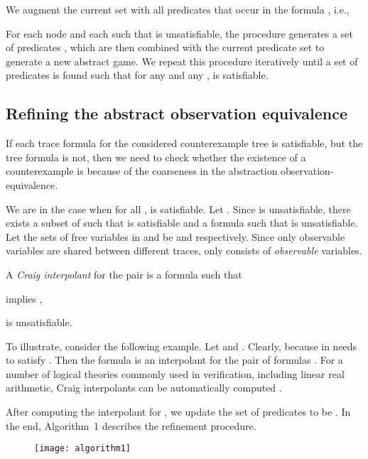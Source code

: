 \documentclass[letterpaper, 10 pt, conference]{ieeeconf}
\begin{document}
We augment the current set  with all
predicates that occur in the formula , i.e.,

For each node  and each  such that  is unsatisfiable, the procedure generates a set of predicates
, which are then combined with the
current predicate set to generate a new abstract game. We repeat
this procedure iteratively until a set of predicates is found such
that for any  and any ,  is satisfiable.

\subsection{Refining the abstract observation equivalence}
\label{subsec:refineobeq}
If each trace formula for the considered counterexample tree is satisfiable, but the tree formula is not, then we need to check
whether the existence of a counterexample is because of the
coarseness in the abstraction observation-equivalence.

We are in the case when for all ,   is satisfiable.  Let
. Since  is unsatisfiable, there exists a subset  of
 such that  is satisfiable and
a formula  such that  is unsatisfiable. Let the sets of
free variables in  and  be  and 
respectively. Since only observable variables are shared between
different traces,  only consists of \emph{observable}
variables.


A \emph{Craig interpolant} \cite{smullyan1995first} for the pair  is
a formula  such that \begin{inparaenum}
\item  implies ,
\item  is unsatisfiable.
\end{inparaenum}
To illustrate, consider the following example. Let  and . Clearly,
 because  in  needs
to satisfy .  Then the formula  is an
interpolant for the pair of formulas
. For a number of logical
theories commonly used in verification, including linear real
arithmetic, Craig interpolants can be automatically computed
\cite{McMillan2011}.

After computing the interpolant  for , we update the set of
predicates to be
. 
In the end, Algorithm~1 describes
the refinement procedure.
\vspace{-2ex}
\begin{figure}[ht]
\centering
\texttt{[image: algorithm1]}
\label{alg:abstractrefine}
\end{figure}
\vspace{-4ex}
\end{document}
